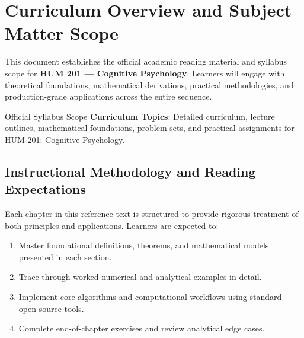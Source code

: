 \section{Curriculum Overview and Subject Matter Scope}

This document establishes the official academic reading material and syllabus scope for \textbf{HUM 201 --- Cognitive Psychology}. Learners will engage with theoretical foundations, mathematical derivations, practical methodologies, and production-grade applications across the entire sequence.

\begin{InsightBox}{Official Syllabus Scope}
  \textbf{Curriculum Topics}: Detailed curriculum, lecture outlines, mathematical foundations, problem sets, and practical assignments for HUM 201: Cognitive Psychology.
\end{InsightBox}

\subsection{Instructional Methodology and Reading Expectations}

Each chapter in this reference text is structured to provide rigorous treatment of both principles and applications. Learners are expected to:
\begin{enumerate}
  \item Master foundational definitions, theorems, and mathematical models presented in each section.
  \item Trace through worked numerical and analytical examples in detail.
  \item Implement core algorithms and computational workflows using standard open-source tools.
  \item Complete end-of-chapter exercises and review analytical edge cases.
\end{enumerate}

